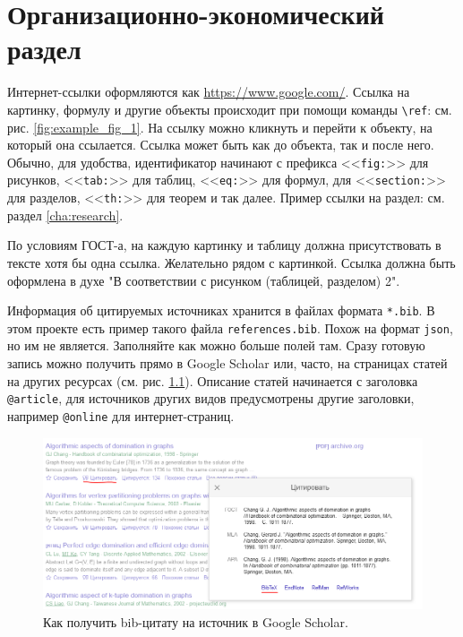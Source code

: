 \chapter{Организационно-экономический раздел}
\label{cha:econom}

Интернет-ссылки оформляются как \url{https://www.google.com/}. Ссылка на картинку, формулу и другие объекты происходит при помощи команды \verb|\ref|: см. рис. \ref{fig:example_fig_1}. На ссылку можно кликнуть и перейти к объекту, на который она ссылается. Ссылка может быть как до объекта, так и после него. Обычно, для удобства, идентификатор начинают с префикса <<\verb|fig:|>> для рисунков, <<\verb|tab:|>> для таблиц, <<\verb|eq:|>> для формул, для <<\verb|section:|>> для разделов, <<\verb|th:|>> для теорем и так далее. Пример ссылки на раздел: см. раздел \ref{cha:research}. 

По условиям ГОСТ-а, на каждую картинку и таблицу должна присутствовать в тексте хотя бы одна ссылка. Желательно рядом с картинкой. Ссылка должна быть оформлена в духе "{}В соответствии с рисунком (таблицей, разделом) 2"{}.

Информация об цитируемых источниках хранится в файлах формата \verb|*.bib|. В этом проекте есть пример такого файла \verb|references.bib|. Похож на формат \verb|json|, но им не является. Заполняйте как можно больше полей там. Сразу готовую запись можно получить прямо в Google Scholar или, часто, на страницах статей на других ресурсах (см. рис. \ref{fig:scholar}). Описание статей начинается с заголовка \verb|@article|, для источников других видов предусмотрены другие заголовки, например \verb|@online| для интернет-страниц.

\begin{figure}[ht]
    \centering
    \includegraphics[scale=0.5]{res/img/scholar.png}
    \caption{Как получить bib-цитату на источник в Google Scholar.}
    \label{fig:scholar}
\end{figure}

